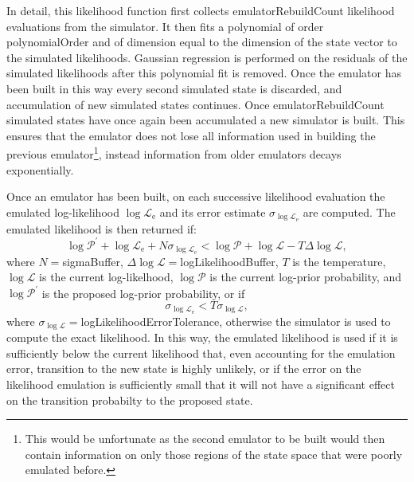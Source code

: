 In detail, this likelihood function first collects {\normalfont \ttfamily emulatorRebuildCount} likelihood evaluations from the simulator. It then fits a polynomial of order {\normalfont \ttfamily polynomialOrder} and of dimension equal to the dimension of the state vector to the simulated likelihoods. Gaussian regression is performed on the residuals of the simulated likelihoods after this polynomial fit is removed. Once the emulator has been built in this way every second simulated state is discarded, and accumulation of new simulated states continues. Once {\normalfont \ttfamily emulatorRebuildCount} simulated states have once again been accumulated a new simulator is built. This ensures that the emulator does not lose all information used in building the previous emulator\footnote{This would be unfortunate as the second emulator to be built would then contain information on only those regions of the state space that were poorly emulated before.}, instead information from older emulators decays exponentially.

Once an emulator has been built, on each successive likelihood evaluation the emulated log-likelihood $\log\mathcal{L}_{\mathrm e}$ and its error estimate $\sigma_{\log\mathcal{L}_{\mathrm e}}$ are computed. The emulated likelihood is then returned if:
\begin{equation}
\log\mathcal{P}^\prime + \log\mathcal{L}_{\mathrm e} + N \sigma_{\log\mathcal{L}_{\mathrm e}} < \log\mathcal{P} + \log\mathcal{L} - T \Delta\log\mathcal{L},
\end{equation}
where $N=${\normalfont \ttfamily sigmaBuffer}, $\Delta\log\mathcal{L}=${\normalfont \ttfamily logLikelihoodBuffer}, $T$ is the temperature, $\log\mathcal{L}$ is the current log-likelhood, $\log\mathcal{P}$ is the current log-prior probability, and $\log\mathcal{P}^\prime$ is the proposed log-prior probability, or if
\begin{equation}
\sigma_{\log\mathcal{L}_{\mathrm e}} < T \sigma_{\log\mathcal{L}},
\end{equation}
where $\sigma_{\log\mathcal{L}}=${\normalfont \ttfamily logLikelihoodErrorTolerance}, otherwise the simulator is used to compute the exact likelihood. In this way, the emulated likelihood is used if it is sufficiently below the current likelihood that, even accounting for the emulation error, transition to the new state is highly unlikely, or if the error on the likelihood emulation is sufficiently small that it will not have a significant effect on the transition probabilty to the proposed state.

